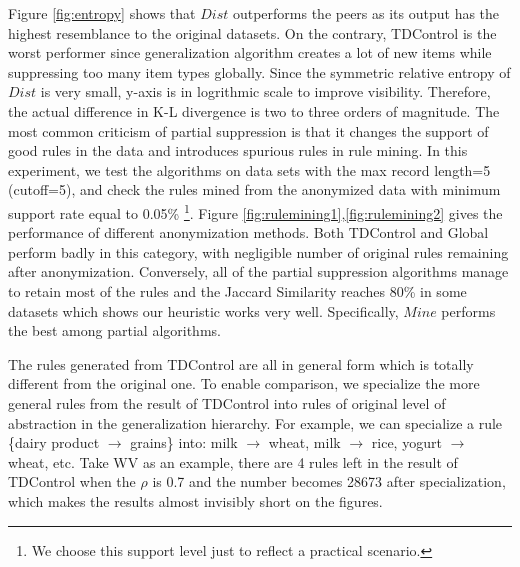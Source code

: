 Figure \ref{fig:entropy} shows that $Dist$ outperforms the peers
 as its output has the highest resemblance
to the original datasets.
On the contrary, TDControl is the worst performer
since generalization algorithm creates a lot of new items while
suppressing too many item types globally.
Since the symmetric relative entropy of $Dist$ is very small, y-axis is
in logrithmic scale to improve visibility. Therefore, the actual difference
in K-L divergence is two to three orders of magnitude.
The most common criticism of partial suppression is that it
changes the support of good rules in the data and introduces spurious
rules in rule mining. In this experiment, we test the algorithms on
data sets with the max record length=5 (cutoff=5),
and check the rules mined from the anonymized data
with minimum support rate equal to
0.05\% \footnote{We choose this support level just to
reflect a practical scenario.}.
Figure \ref{fig:rulemining1},\ref{fig:rulemining2} gives the performance of different anonymization methods.
Both TDControl and Global perform badly in this category, with
negligible number of original rules remaining after anonymization.
Conversely, all of the partial
suppression algorithms manage to retain most of the rules and the Jaccard Similarity reaches 80\% in some datasets which shows
our heuristic works very well.
Specifically, $Mine$ performs the best among partial algorithms.

The rules generated from TDControl are all in general form which is
totally different from the original one. To enable comparison,
we specialize the more general rules from the result of TDControl
into rules of original level of abstraction in the generalization hierarchy.
For example, we can specialize a rule \{dairy product $\rightarrow$ grains\}
into:
\rm{milk} $\rightarrow$ \rm{wheat},
\rm{milk} $\rightarrow$ \rm{rice},
\rm{yogurt} $\rightarrow$ \rm{wheat}, etc.
Take WV as an example, there are 4 rules left in the result of TDControl when
the $\rho$ is 0.7 and the number becomes 28673 after
specialization, which makes the results almost invisibly short
on the figures.

